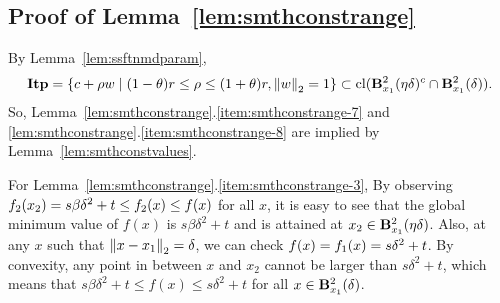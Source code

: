 \subsection{Proof of Lemma~\ref{lem:smthconstrange}}
\label{sec:proof-smthconstrange}
By Lemma~\ref{lem:ssftnmdparam}, 
\begin{equation*}
	\itpset
	=
	\left \{ 
	c + \rho w 
	\mid
	(1-\theta) r \leq \rho \leq (1+\theta) r, 
	\ltwo{w} = 1
	\right \}
	\subset \cl (\balltwo{x_1}{\eta\delta}^c \cap \balltwo{x_1}{\delta}).
\end{equation*}
So, Lemma~\ref{lem:smthconstrange}.\ref{item:smthconstrange-7} and \ref{lem:smthconstrange}.\ref{item:smthconstrange-8} are implied by Lemma~\ref{lem:smthconstvalues}.

For Lemma~\ref{lem:smthconstrange}.\ref{item:smthconstrange-3},
By observing $f_{2}(x_2) = s \beta \delta^2+t \leq f_{2}(x) \leq f(x)$ for all $x$, 
it is easy to see that the global minimum value of $f(x)$ is $s \beta \delta^2+t$ and is attained at $x_2 \in \mathbf{B}^2_{x_1}({\eta\delta})$.
Also, at any $x$ such that $\left\|{x-x_1}\right\|_2 = \delta$, we can check $f(x) = f_{1}(x) =s \delta^2+t$.
By convexity, any point in between $x$ and $x_2$ cannot be larger than $s \delta^2+t$, which means that
$s \beta \delta^2 + t \leq f(x) \leq s \delta^2 + t$ for all $x \in \mathbf{B}^2_{x_1}({\delta})$.

